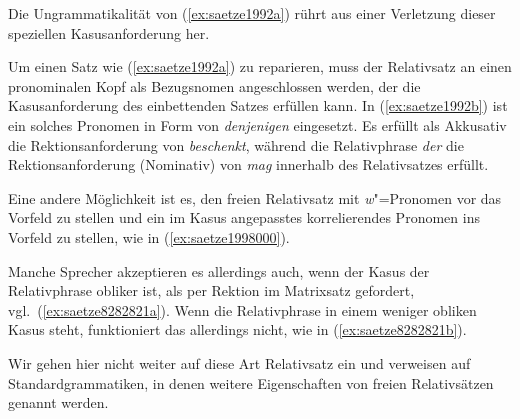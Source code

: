 Die Ungrammatikalität von (\ref{ex:saetze1992a}) rührt aus einer Verletzung dieser speziellen Kasusanforderung her.

\begin{exe}
\end{exe}

Um einen Satz wie (\ref{ex:saetze1992a}) zu reparieren, muss der Relativsatz an einen pronominalen Kopf als Bezugsnomen angeschlossen werden, der die Kasusanforderung des einbettenden Satzes erfüllen kann.
In (\ref{ex:saetze1992b}) ist ein solches Pronomen in Form von \textit{denjenigen} eingesetzt.
Es erfüllt als Akkusativ die Rektionsanforderung von \textit{beschenkt}, während die Relativphrase \textit{der} die Rektionsanforderung (Nominativ) von \textit{mag} innerhalb des Relativsatzes erfüllt.

\begin{exe}
\end{exe}

Eine andere Möglichkeit ist es, den freien Relativsatz mit \textit{w}"=Pronomen vor das Vorfeld zu stellen und ein im Kasus angepasstes korrelierendes Pronomen ins Vorfeld zu stellen, wie in (\ref{ex:saetze1998000}).

\begin{exe}
\end{exe}

Manche Sprecher akzeptieren es allerdings auch, wenn der Kasus der Relativphrase obliker ist, als per Rektion im Matrixsatz gefordert, vgl.\ (\ref{ex:saetze8282821a}).
Wenn die Relativphrase in einem weniger obliken Kasus steht, funktioniert das allerdings nicht, wie in (\ref{ex:saetze8282821b}).

\newpage

\begin{exe}
  \ex\label{ex:saetze8282821} 
  \begin{xlist}
  \end{xlist}
\end{exe}

Wir gehen hier nicht weiter auf diese Art Relativsatz ein und verweisen auf Standardgrammatiken, in denen weitere Eigenschaften von freien Relativsätzen genannt werden.

